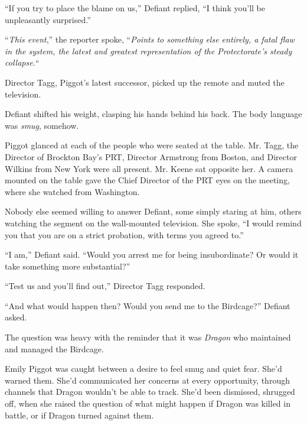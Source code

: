 ``If you try to place the blame on us,'' Defiant replied, ``I think you'll be unpleasantly surprised.''



``\emph{This event},'' the reporter spoke, ``\emph{Points to something else entirely, a fatal flaw in the system, the latest and greatest representation of the Protectorate's steady collapse.}``



Director Tagg, Piggot's latest successor, picked up the remote and muted the television.



Defiant shifted his weight, clasping his hands behind his back.  The body language was \emph{smug}, somehow.



Piggot glanced at each of the people who were seated at the table.  Mr. Tagg, the Director of Brockton Bay's PRT, Director Armstrong from Boston, and Director Wilkins from New York were all present.  Mr. Keene sat opposite her.  A camera mounted on the table gave the Chief Director of the PRT eyes on the meeting, where she watched from Washington.



Nobody else seemed willing to answer Defiant, some simply staring at him, others watching the segment on the wall-mounted television.  She spoke, ``I would remind you that you are on a strict probation, with terms you agreed to.''



``I am,'' Defiant said.  ``Would you arrest me for being insubordinate?  Or would it take something more substantial?''



``Test us and you'll find out,'' Director Tagg responded.



``And what would happen then?  Would you send me to the Birdcage?'' Defiant asked.



The question was heavy with the reminder that it was \emph{Dragon} who maintained and managed the Birdcage.



Emily Piggot was caught between a desire to feel smug and quiet fear.  She'd warned them.  She'd communicated her concerns at every opportunity, through channels that Dragon wouldn't be able to track.  She'd been dismissed, shrugged off, when she raised the question of what might happen if Dragon was killed in battle, or if Dragon turned against them.



